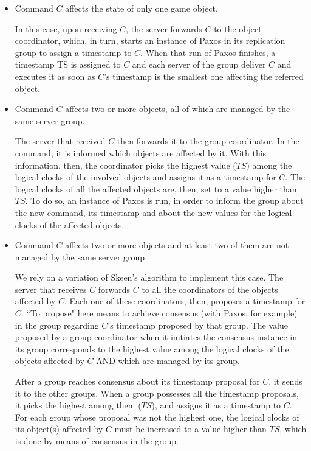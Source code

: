 \documentclass[times, 10pt]{article}
\begin{document}
\begin{itemize}
\item Command $C$ affects the state of only one game object.

In this case, upon receiving $C$, the server forwards $C$ to the object coordinator, which, in turn, starts an instance of Paxos in its replication group to assign a timestamp to $C$. When that run of Paxos finishes, a timestamp TS is assigned to $C$ and each server of the group deliver $C$ and executes it as soon as $C$'s timestamp is the smallest one affecting the referred object.

\item Command $C$ affects two or more objects, all of which are managed by the same server group.

The server that received $C$ then forwards it to the group coordinator. In the command, it is informed which objects are affected by it. With this information, then, the coordinator picks the highest value ($TS$) among the logical clocks of the involved objects and assigns it as a timestamp for $C$. The logical clocks of all the affected objects are, then, set to a value higher than $TS$. To do so, an instance of Paxos is run, in order to inform the group about the new command, its timestamp and about the new values for the logical clocks of the affected objects.

\item Command $C$ affects two or more objects and at least two of them are not managed by the same server group.

We rely on a variation of Skeen's algorithm to implement this case.
The server that receives $C$ forwards $C$ to all the coordinators of the objects affected by $C$. Each one of these coordinators, then, proposes a timestamp for $C$. ``To propose" here means to achieve consensus (with Paxos, for example) in the group regarding $C$'s timestamp proposed by that group. The value proposed by a group coordinator when it initiates the consensus instance in its group corresponds to the highest value among the logical clocks of the objects affected by $C$ AND which are managed by its group.

After a group reaches consensus about its timestamp proposal for $C$, it sends it to the other groups. When a group possesses all the timestamp proposals, it picks the highest among them ($TS$), and assigns it as a timestamp to $C$. For each group whose proposal was not the highest one, the logical clocks of its object(s) affected by $C$ must be increased to a value higher than $TS$, which is done by means of consensus in the group.

\end{itemize}
\end{document}
